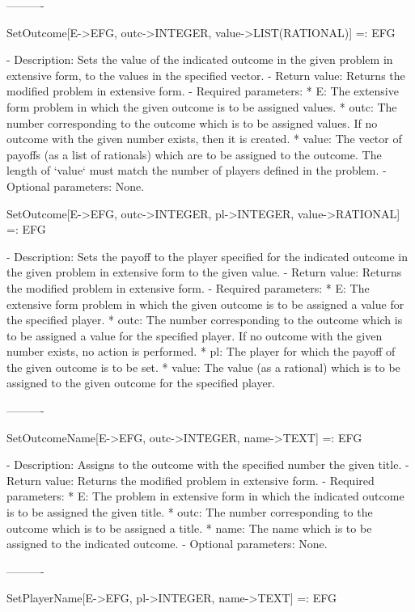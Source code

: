 ----------

SetOutcome[E->EFG, outc->INTEGER, value->LIST(RATIONAL)] =: EFG

   -	Description:  Sets the value of the indicated outcome in the given 
	problem in extensive form, to the values in the specified vector.
   -	Return value:  Returns the modified problem in extensive form. 
   -	Required parameters:
	  *  E:  The extensive form problem in which the given outcome is to be
		assigned values.
	  *  outc:  The number corresponding to the outcome which is to be 
		assigned values.  If no outcome with the given number exists,
		then it is created.
	  *  value:  The vector of payoffs (as a list of rationals) which are 
		to be assigned to the outcome.  The length of `value` must 
		match the number of players defined in the problem.
   -	Optional parameters:  None.


SetOutcome[E->EFG, outc->INTEGER, pl->INTEGER, value->RATIONAL] =: EFG

   -	Description:  Sets the payoff to the player specified for the indicated
	outcome in the given problem in extensive form to the given value.
   -	Return value:  Returns the modified problem in extensive form.
   -	Required parameters:
	  *  E:  The extensive form problem in which the given outcome is to be
		assigned a value for the specified player.
	  *  outc:  The number corresponding to the outcome which is to be 
		assigned a value for the specified player.  If no outcome with
		 the given number exists, no action is performed.
	  *  pl:  The player for which the payoff of the given outcome is to be
		set.
	  *  value:  The value (as a rational) which is to be assigned to the 
		given outcome for the specified player.

----------

SetOutcomeName[E->EFG, outc->INTEGER, name->TEXT] =: EFG

   -	Description:  Assigns to the outcome with the specified number the 
	given title.
   -	Return value:  Returns the modified problem in extensive form.
   -	Required parameters:
	  *  E:  The problem in extensive form in which the indicated outcome 
		is to be assigned the given title.
	  *  outc:  The number corresponding to the outcome which is to be 
		assigned a title.
	  *  name:  The name which is to be assigned to the indicated outcome.
   -	Optional parameters:  None.

----------

SetPlayerName[E->EFG, pl->INTEGER, name->TEXT] =: EFG

